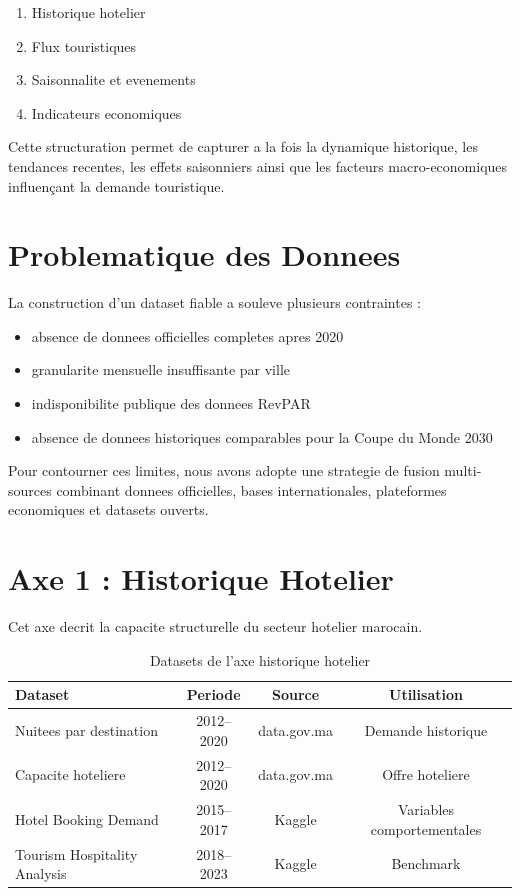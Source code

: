 \documentclass[12pt,a4paper]{report}
\begin{document}
\begin{enumerate}
    \item Historique hotelier
    \item Flux touristiques
    \item Saisonnalite et evenements
    \item Indicateurs economiques
\end{enumerate}

Cette structuration permet de capturer a la fois la dynamique historique,
les tendances recentes, les effets saisonniers ainsi que les facteurs
macro-economiques influençant la demande touristique.

\section{Problematique des Donnees}

La construction d'un dataset fiable a souleve plusieurs contraintes :

\begin{itemize}
    \item absence de donnees officielles completes apres 2020
    \item granularite mensuelle insuffisante par ville
    \item indisponibilite publique des donnees RevPAR
    \item absence de donnees historiques comparables pour la Coupe du Monde 2030
\end{itemize}

Pour contourner ces limites, nous avons adopte une strategie de fusion
multi-sources combinant donnees officielles, bases internationales,
plateformes economiques et datasets ouverts.

\section{Axe 1 : Historique Hotelier}

Cet axe decrit la capacite structurelle du secteur hotelier marocain.

\begin{table}[H]
\centering
\small
\begin{tabular}{lccc}
\toprule
Dataset & Periode & Source & Utilisation \\
\midrule
Nuitees par destination & 2012--2020 & data.gov.ma & Demande historique \\
Capacite hoteliere & 2012--2020 & data.gov.ma & Offre hoteliere \\
Hotel Booking Demand & 2015--2017 & Kaggle & Variables comportementales \\
Tourism Hospitality Analysis & 2018--2023 & Kaggle & Benchmark \\
\bottomrule
\end{tabular}
\caption{Datasets de l'axe historique hotelier}
\end{table}
\end{document}
